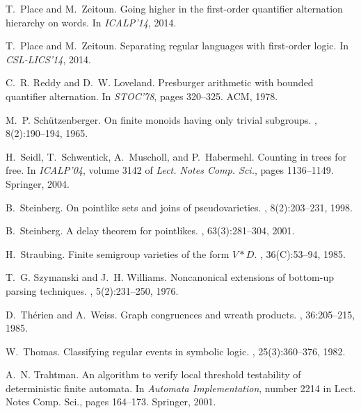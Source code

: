 \documentclass{LMCS}
\theoremstyle{plain}
\begin{document}
\begin{thebibliography}{10}
T.~Place and M.~Zeitoun.
\newblock Going higher in the first-order quantifier alternation hierarchy on
  words.
\newblock In {\em {ICALP'14}}, 2014.

T.~Place and M.~Zeitoun.
\newblock Separating regular languages with first-order logic.
\newblock In {\em {CSL-LICS'14}}, 2014.

C.~R. Reddy and D.~W. Loveland.
\newblock Presburger arithmetic with bounded quantifier alternation.
\newblock In {\em STOC'78}, pages 320--325. ACM, 1978.

M.~P. Sch{\"u}tzenberger.
\newblock On finite monoids having only trivial subgroups.
, 8(2):190--194, 1965.

H.~Seidl, T.~Schwentick, A.~Muscholl, and P.~Habermehl.
\newblock Counting in trees for free.
\newblock In {\em ICALP'04}, volume 3142 of {\em Lect. Notes Comp. Sci.}, pages
  1136--1149. Springer, 2004.

B.~Steinberg.
\newblock On pointlike sets and joins of pseudovarieties.
, 8(2):203--231, 1998.

B.~Steinberg.
\newblock A delay theorem for pointlikes.
, 63(3):281--304, 2001.

H.~Straubing.
\newblock Finite semigroup varieties of the form {${V*D}$}.
, 36({C}):53--94, 1985.

T.~G. Szymanski and J.~H. Williams.
\newblock Noncanonical extensions of bottom-up parsing techniques.
, 5(2):231--250, 1976.

D.~Th{\'e}rien and A.~Weiss.
\newblock Graph congruences and wreath products.
, 36:205--215, 1985.

W.~Thomas.
\newblock Classifying regular events in symbolic logic.
, 25(3):360--376, 1982.

A.~N. Trahtman.
\newblock An algorithm to verify local threshold testability of deterministic
  finite automata.
\newblock In {\em Automata Implementation}, number 2214 in Lect. Notes Comp.
  Sci., pages 164--173. Springer, 2001.


\end{thebibliography}
\end{document}

